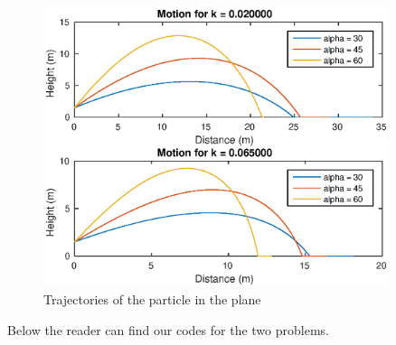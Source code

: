 \begin{figure}[!h]
\centering
\includegraphics[width = 0.9\textwidth]{./c2.eps}
\caption{Trajectories of the particle in the plane}
\label{fig:c2}
\end{figure}
\FloatBarrier
Below the reader can find our codes for the two problems.



